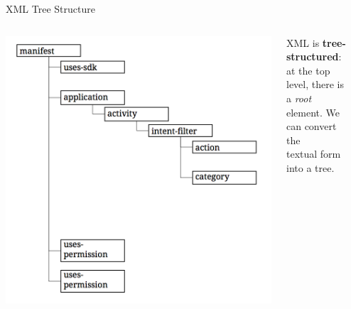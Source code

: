 \documentclass[aspectratio=169]{beamer}
\begin{document}
\begin{frame}[fragile]{XML Tree Structure}
\begin{columns}
\begin{column}{0.55\textwidth}
\begin{center}
\includegraphics[height=0.95\textheight]{img/XML-Structure.png}
\end{center}
\end{column}
\begin{column}{0.4\textwidth}
XML is \textbf{tree-structured}: \\
\vspace{0.25em}
\quad at the top level, there is a \emph{root} \\
\quad element. We can convert the \\ 
\quad textual form into a tree.
\end{column}
\begin{column}{0.05\textwidth}\end{column}
\end{columns}
\end{frame}
\end{document}
